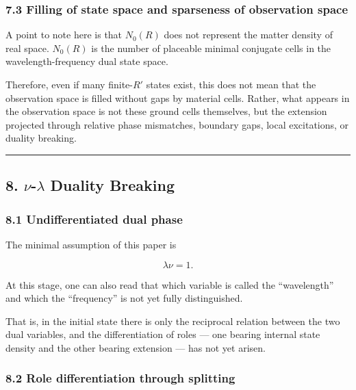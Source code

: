\documentclass[
]{article}
\begin{document}
\subsubsection{7.3 Filling of state space and sparseness of observation
space}\label{filling-of-state-space-and-sparseness-of-observation-space}

A point to note here is that \(N_0(R)\) does not represent the matter
density of real space. \(N_0(R)\) is the number of placeable minimal
conjugate cells in the wavelength-frequency dual state space.

Therefore, even if many finite-\(R'\) states exist, this does not mean
that the observation space is filled without gaps by material cells.
Rather, what appears in the observation space is not these ground cells
themselves, but the extension projected through relative phase
mismatches, boundary gaps, local excitations, or duality breaking.

\begin{center}\rule{0.5\linewidth}{0.5pt}\end{center}

\subsection{\texorpdfstring{8. \(\nu\)-\(\lambda\) Duality
Breaking}{8. \textbackslash nu-\textbackslash lambda Duality Breaking}}\label{nu-lambda-duality-breaking}

\subsubsection{8.1 Undifferentiated dual
phase}\label{undifferentiated-dual-phase}

The minimal assumption of this paper is

\[
\lambda\nu=1.
\]

At this stage, one can also read that which variable is called the
``wavelength'' and which the ``frequency'' is not yet fully
distinguished.

That is, in the initial state there is only the reciprocal relation
between the two dual variables, and the differentiation of roles --- one
bearing internal state density and the other bearing extension --- has
not yet arisen.

\subsubsection{8.2 Role differentiation through
splitting}\label{role-differentiation-through-splitting}
\end{document}
